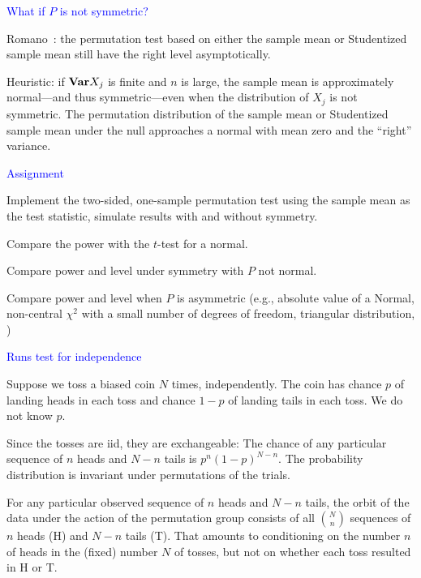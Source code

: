 \documentclass[landscape]{slides}
\newcommand{\Var}{{\bf Var}}
\begin{document}
\begin{slide}
{\textcolor{blue}{What if $P$ is not symmetric?}}

Romano~\cite{romano90}: the permutation test based on
either the sample mean or Studentized sample mean
still have the right level asymptotically.

Heuristic:  if $\Var X_j$ is finite and $n$ is large, the sample mean is
approximately normal---and thus symmetric---even when the
distribution of $X_j$ is not symmetric.
The permutation distribution of the sample mean or Studentized
sample mean under the null approaches a normal with mean zero
and the ``right'' variance.

\end{slide}

\begin{slide}
{\textcolor{blue}{Assignment}}

Implement the two-sided, one-sample permutation test using the sample mean as the
test statistic, simulate results with and without symmetry.

Compare the power with the $t$-test for a normal.

Compare power and level under symmetry with $P$ not normal.

Compare power and level when $P$ is asymmetric (e.g., absolute value of a Normal,
non-central $\chi^2$ with a small number of degrees of freedom, triangular distribution, \textellipsis)

\end{slide}

\begin{slide}
{\textcolor{blue}{Runs test for independence}}

Suppose we toss a biased coin $N$ times, independently.
The coin has chance $p$ of landing heads in each toss and chance
$1-p$ of landing tails in each toss.
We do not know $p$.

Since the tosses are iid, they are exchangeable:
The chance of any particular sequence 
of $n$ heads and $N-n$ tails is $p^n(1-p)^{N-n}$.
The probability distribution is invariant under permutations of the trials.

For any particular observed sequence of $n$ heads and $N-n$ tails, the 
orbit of the data under the action of the permutation group consists of all
${{N}\choose{n}}$ sequences of $n$ heads (H) and $N-n$ tails (T).
That amounts to conditioning on the number $n$ of heads in the (fixed)
number $N$ of tosses, but not on whether each toss resulted in H or T.

\end{slide}
\end{document}
